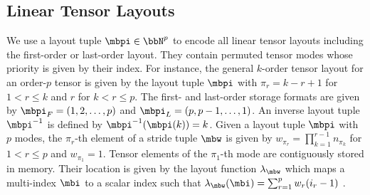 \subsection{Linear Tensor Layouts}
\label{sec:preliminaries:layout}
We use a layout tuple $\mbpi \in \bbN^p$ to encode all linear tensor layouts including the first-order or last-order layout.
They contain permuted tensor modes whose priority is given by their index.
For instance, the general $k$-order tensor layout for an order-$p$ tensor is given by the layout tuple $\mbpi$ with $\pi_r = k-r+1$ for $1 < r \leq k$ and $r$ for $k < r \leq p$.
The first- and last-order storage formats are given by $\mbpi_F = (1,2,\dots,p)$ and $\mbpi_{L} = (p,p-1,\dots,1)$.
An inverse layout tuple $\mbpi^{-1}$ is defined by $\mbpi^{-1}(\mbpi(k)) = k$.
Given a layout tuple $\mbpi$ with $p$ modes, the $\pi_r$-th element of a stride tuple $\mbw$ is given by $w_{\pi_r} = \prod_{k=1}^{r-1} n_{\pi_k}$ for $1 < r \leq p$ and $w_{\pi_1} = 1$.
Tensor elements of the $\pi_1$-th mode are contiguously stored in memory.
Their location is given by the layout function $\lambda_{\mbw}$ which maps a multi-index $\mbi$ to a scalar index such that $\lambda_{\mbw}(\mbi) = \sum_{r=1}^p w_{r} (i_{r}-1)$ \cite{bassoy:2018:fast}.

